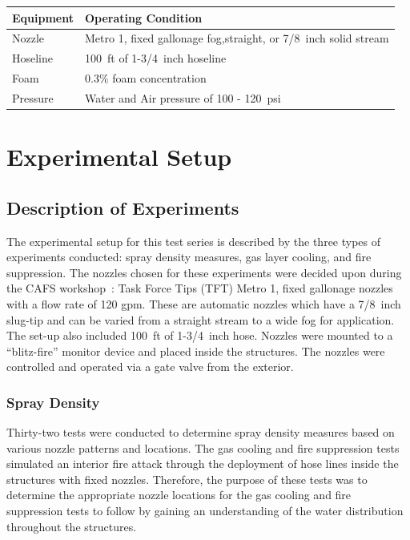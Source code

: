 \documentclass[12pt,oneside]{book}
\begin{document}
\begin{table}[!ht]
\centering
{}\label{tab:op_condition}
\begin{tabular}{ll}
\toprule[1.5pt]
Equipment    &   Operating Condition \\
\midrule
Nozzle       & Metro 1, fixed gallonage fog,straight, or 7/8~inch solid stream \\
Hoseline     & 100~ft of 1-3/4~inch hoseline \\
Foam         & 0.3\% foam concentration \\
Pressure     & Water and Air pressure of 100 - 120~psi \\
\bottomrule[1.25pt]
\end{tabular}\par
\end{table}


\chapter{Experimental Setup}

\section{Description of Experiments}
\label{sec:desc_experiments}
The experimental setup for this test series is described by the three types of experiments conducted: spray density measures, gas layer cooling, and fire suppression. The nozzles chosen for these experiments were decided upon during the CAFS workshop~\cite{Grant:2011}: Task Force Tips (TFT) Metro 1, fixed gallonage nozzles with a flow rate of 120 gpm. These are automatic nozzles which have a 7/8~inch slug-tip and can be varied from a straight stream to a wide fog for application. The set-up also included 100~ft of 1-3/4~inch hose. Nozzles were mounted to a ``blitz-fire'' monitor device and placed inside the structures. The nozzles were controlled and operated via a gate valve from the exterior.

\subsection{Spray Density}
\label{sec:desc_Spray_Density}

Thirty-two tests were conducted to determine spray density measures based on various nozzle patterns and locations. The gas cooling and fire suppression tests simulated an interior fire attack through the deployment of hose lines inside the structures with fixed nozzles. Therefore, the purpose of these tests was to determine the appropriate nozzle locations for the gas cooling and fire suppression tests to follow by gaining an understanding of the water distribution throughout the structures.
\end{document}
